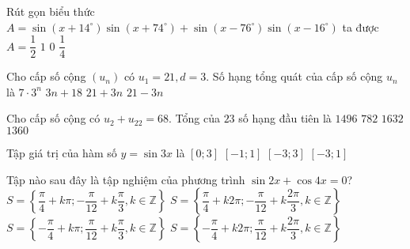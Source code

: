 \begin{ex}%
	Rút gọn biểu thức $A=\sin \left(x+14^\circ\right) \sin \left(x+74^\circ\right)+\sin \left(x-76^\circ\right) \sin \left(x-16^\circ\right)$ ta được
	\choice
	{$A=\dfrac{1}{2}$}
	{$1$}
	{$0$}
	{$\dfrac{1}{4}$}
\end{ex}
\begin{ex}%
	Cho cấp số cộng $\left(u_n\right)$ có $u_1=21, d=3$. Số hạng tổng quát của cấp số cộng $u_n$ là
	\choice
	{$7 \cdot 3^n$}
	{\True $3n+18$}
	{$21+3n$}
	{$21-3n$}
\end{ex}
\begin{ex}%
	Cho cấp số cộng có $u_2+u_{22}=68$. Tổng của $23$ số hạng đầu tiên là
	\choice
	{$1496$}
	{\True $782$}
	{$1632$}
	{$1360$}
\end{ex}
\begin{ex}%
	Tập giá trị của hàm số $y=\sin 3 x$ là
	\choice
	{$[0; 3]$}
	{\True $[-1; 1]$}
	{$[-3; 3]$}
	{$[-3; 1]$}
\end{ex}
\begin{ex}%
	Tập nào sau đây là tập nghiệm của phương trình $\sin 2 x+\cos 4 x=0$?
	\choice
	{\True $S=\left\{\dfrac{\pi}{4}+k\pi;-\dfrac{\pi}{12}+k \dfrac{\pi}{3}, k \in \mathbb{Z}\right\}$}
	{$S=\left\{\dfrac{\pi}{4}+k2 \pi;-\dfrac{\pi}{12}+k \dfrac{2 \pi}{3}, k \in \mathbb{Z}\right\}$}
	{$S=\left\{-\dfrac{\pi}{4}+k \pi; \dfrac{\pi}{12}+k \dfrac{\pi}{3}, k \in \mathbb{Z}\right\}$}
	{$S=\left\{-\dfrac{\pi}{4}+k 2 \pi; \dfrac{\pi}{12}+k \dfrac{2 \pi}{3}, k \in \mathbb{Z}\right\}$}
\end{ex}
